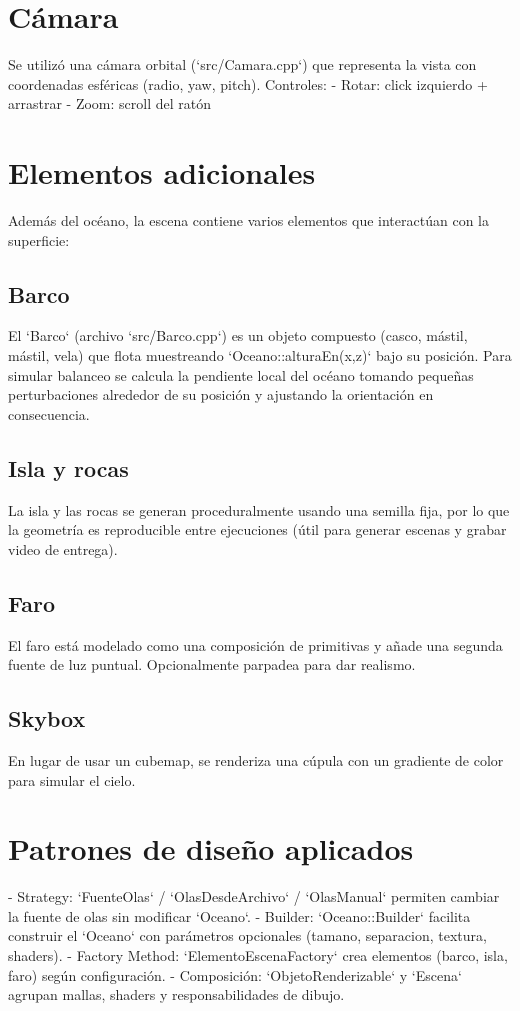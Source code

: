 \documentclass[11pt]{article}
\begin{document}
\section{Cámara}
Se utilizó una cámara orbital (`src/Camara.cpp`) que representa la vista con
coordenadas esféricas (radio, yaw, pitch). Controles:
- Rotar: click izquierdo + arrastrar
- Zoom: scroll del ratón

\section{Elementos adicionales}
Además del océano, la escena contiene varios elementos que interactúan con
la superficie:

\subsection{Barco}
El `Barco` (archivo `src/Barco.cpp`) es un objeto compuesto (casco, mástil,
mástil, vela) que flota muestreando `Oceano::alturaEn(x,z)` bajo su posición. Para
simular balanceo se calcula la pendiente local del océano tomando pequeñas
perturbaciones alrededor de su posición y ajustando la orientación en
consecuencia.

\subsection{Isla y rocas}
La isla y las rocas se generan proceduralmente usando una semilla fija, por
lo que la geometría es reproducible entre ejecuciones (útil para generar
escenas y grabar video de entrega).

\subsection{Faro}
El faro está modelado como una composición de primitivas y añade una segunda
fuente de luz puntual. Opcionalmente parpadea para dar realismo.

\subsection{Skybox}
En lugar de usar un cubemap, se renderiza una cúpula con un gradiente de
color para simular el cielo.

\section{Patrones de diseño aplicados}
- Strategy: `FuenteOlas` / `OlasDesdeArchivo` / `OlasManual` permiten cambiar
  la fuente de olas sin modificar `Oceano`.
- Builder: `Oceano::Builder` facilita construir el `Oceano` con parámetros
  opcionales (tamano, separacion, textura, shaders).
- Factory Method: `ElementoEscenaFactory` crea elementos (barco, isla, faro)
  según configuración.
- Composición: `ObjetoRenderizable` y `Escena` agrupan mallas, shaders y
  responsabilidades de dibujo.
\end{document}
